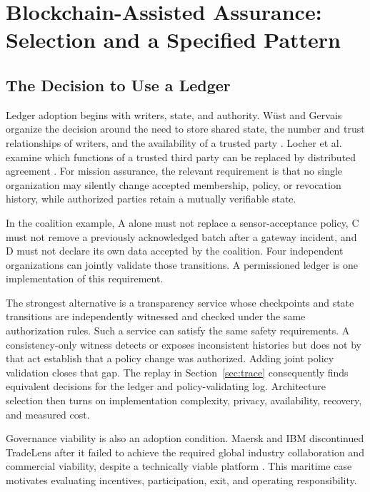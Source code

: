 \section{Blockchain-Assisted Assurance: Selection and a Specified Pattern}

\subsection{The Decision to Use a Ledger}\label{sec:ledger-choice}

Ledger adoption begins with writers, state, and authority. W\"ust and Gervais organize the decision around the need to store shared state, the number and trust relationships of writers, and the availability of a trusted party \citep{wust2018need}. Locher et al. examine which functions of a trusted third party can be replaced by distributed agreement \citep{locher2018when}. For mission assurance, the relevant requirement is that no single organization may silently change accepted membership, policy, or revocation history, while authorized parties retain a mutually verifiable state.

In the coalition example, A alone must not replace a sensor-acceptance policy, C must not remove a previously acknowledged batch after a gateway incident, and D must not declare its own data accepted by the coalition. Four independent organizations can jointly validate those transitions. A permissioned ledger is one implementation of this requirement.

The strongest alternative is a transparency service whose checkpoints and state transitions are independently witnessed and checked under the same authorization rules. Such a service can satisfy the same safety requirements. A consistency-only witness detects or exposes inconsistent histories but does not by that act establish that a policy change was authorized. Adding joint policy validation closes that gap. The replay in Section~\ref{sec:trace} consequently finds equivalent decisions for the ledger and policy-validating log. Architecture selection then turns on implementation complexity, privacy, availability, recovery, and measured cost.

Governance viability is also an adoption condition. Maersk and IBM discontinued TradeLens after it failed to achieve the required global industry collaboration and commercial viability, despite a technically viable platform \citep{maersk2022tradelens}. This maritime case motivates evaluating incentives, participation, exit, and operating responsibility.

